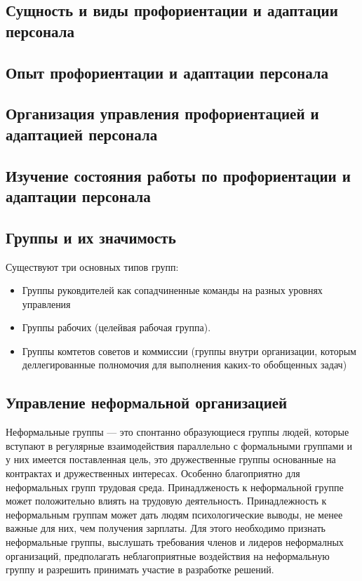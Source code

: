 \documentclass[a4paper,12pt,oneside,final]{extarticle}
\numberwithin{equation}{section}
\begin{document}
\subsection{Сущность и виды профориентации и адаптации персонала}

\subsection{Опыт профориентации и адаптации персонала}

\subsection{Организация управления профориентацией и адаптацией персонала}

\subsection{Изучение состояния работы по профориентации и адаптации персонала}

\subsection{Группы и их значимость}
Существуют три основных типов групп:
\begin{itemize}
	\item Группы руковдителей как сопадчиненные команды на разных уровнях управления
	\item Группы рабочих (целейвая рабочая группа).
	\item Группы комтетов советов и коммиссии (группы внутри организации, которым деллегированные полномочия для выполнения каких-то обобщенных задач)
\end{itemize}

\subsection{Управление неформальной организацией }
Неформальные группы --- это спонтанно образующиеся группы людей, которые вступают в регулярные взаимодействия параллельно с формальными группами и у них имеется поставленная цель, это дружественные группы основанные на контрактах и дружественных интересах. 
Особенно благоприятно для неформальных групп трудовая среда. 
Принадлженость к неформальной группе может положительно влиять на трудовую деятельность. 
Принадлежность к неформальным группам может дать людям психологические выводы, не менее важные для них, чем получения зарплаты. 
Для этого необходимо признать неформальные группы, выслушать требования членов и лидеров неформалных организаций, предполагать неблагоприятные воздействия на неформальную группу и разрешить принимать участие в разработке решений. 
\end{document}
